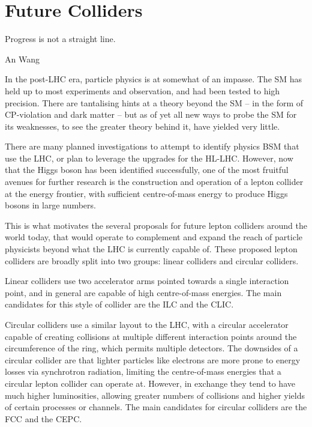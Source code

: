 \chapter{Future Colliders}
\label{chapter:colliders}

\epigraph{Progress is not a straight line.}{An Wang}

In the post-LHC era, particle physics is at somewhat of an impasse. The \acrfull{SM} has held up to most experiments and observation, and had been tested to high precision. There are tantalising hints at a theory beyond the \acrlong{SM} -- in the form of CP-violation and dark matter -- but as of yet all new ways to probe the \acrshort{SM} for its weaknesses, to see the greater theory behind it, have yielded very little. 

There are many planned investigations to attempt to identify physics \acrlong{BSM} that use the \acrfull{LHC}, or plan to leverage the upgrades for the \acrfull{HL-LHC}. However, now that the Higgs boson has been identified successfully, one of the most fruitful avenues for further research is the construction and operation of a lepton collider at the energy frontier, with sufficient centre-of-mass energy to produce Higgs bosons in large numbers.

This is what motivates the several proposals for future lepton colliders around the world today, that would operate to complement and expand the reach of particle physicists beyond what the \acrshort{LHC} is currently capable of. These proposed lepton colliders are broadly split into two groups: linear colliders and circular colliders. 

Linear colliders use two accelerator arms pointed towards a single interaction point, and in general are capable of high centre-of-mass energies. The main candidates for this style of collider are the \acrfull{ILC} and the \acrfull{CLIC}. 

Circular colliders use a similar layout to the \acrshort{LHC}, with a circular accelerator capable of creating collisions at multiple different interaction points around the circumference of the ring, which permits multiple detectors. The downsides of a circular collider are that lighter particles like electrons are more prone to energy losses via synchrotron radiation, limiting the centre-of-mass energies that a circular lepton collider can operate at. However, in exchange they tend to have much higher luminosities, allowing greater numbers of collisions and higher yields of certain processes or channels. The main candidates for circular colliders are the \acrfull{FCC} and the \acrfull{CEPC}. 

